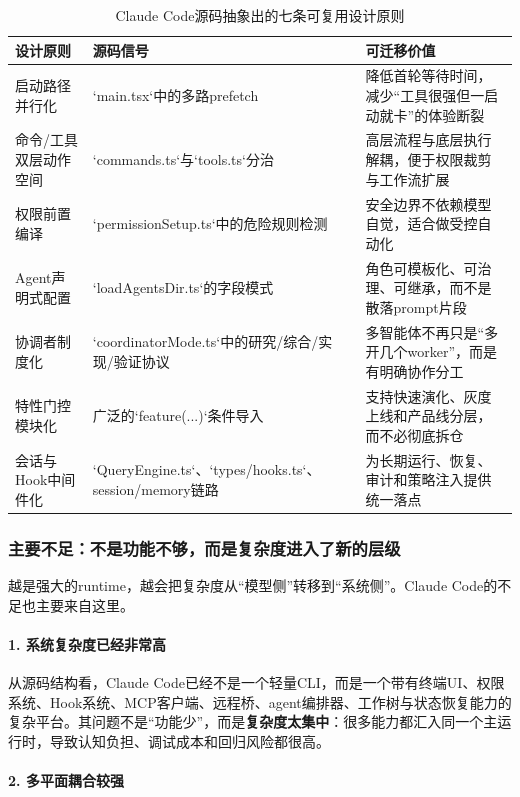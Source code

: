 \documentclass[12pt,a4paper]{article}
\begin{document}
\begin{table}[H]
\centering
\caption{Claude Code源码抽象出的七条可复用设计原则}
\begin{tabular}{p{3.2cm}p{4.4cm}p{4.6cm}}
\toprule
\textbf{设计原则} & \textbf{源码信号} & \textbf{可迁移价值} \\
\midrule
启动路径并行化 & `main.tsx`中的多路prefetch & 降低首轮等待时间，减少“工具很强但一启动就卡”的体验断裂 \\
命令/工具双层动作空间 & `commands.ts`与`tools.ts`分治 & 高层流程与底层执行解耦，便于权限裁剪与工作流扩展 \\
权限前置编译 & `permissionSetup.ts`中的危险规则检测 & 安全边界不依赖模型自觉，适合做受控自动化 \\
Agent声明式配置 & `loadAgentsDir.ts`的字段模式 & 角色可模板化、可治理、可继承，而不是散落prompt片段 \\
协调者制度化 & `coordinatorMode.ts`中的研究/综合/实现/验证协议 & 多智能体不再只是“多开几个worker”，而是有明确协作分工 \\
特性门控模块化 & 广泛的`feature(...)`条件导入 & 支持快速演化、灰度上线和产品线分层，而不必彻底拆仓 \\
会话与Hook中间件化 & `QueryEngine.ts`、`types/hooks.ts`、session/memory链路 & 为长期运行、恢复、审计和策略注入提供统一落点 \\
\bottomrule
\end{tabular}
\end{table}

\subsubsection{主要不足：不是功能不够，而是复杂度进入了新的层级}

越是强大的runtime，越会把复杂度从“模型侧”转移到“系统侧”。Claude Code的不足也主要来自这里。

\paragraph{1. 系统复杂度已经非常高}

从源码结构看，Claude Code已经不是一个轻量CLI，而是一个带有终端UI、权限系统、Hook系统、MCP客户端、远程桥、agent编排器、工作树与状态恢复能力的复杂平台。其问题不是“功能少”，而是\textbf{复杂度太集中}：很多能力都汇入同一个主运行时，导致认知负担、调试成本和回归风险都很高。

\paragraph{2. 多平面耦合较强}
\end{document}
